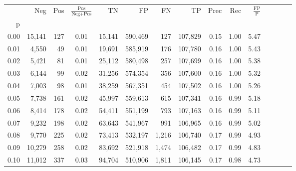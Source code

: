 \begin{tabular}{rrrcrrrrrrrrrrr}
\toprule
{} &     Neg &    Pos & $\frac{\text{Pos}}{\text{Neg}+\text{Pos}}$ &       TN &       FP &       FN &       TP &  Prec &   Rec & $\frac{\text{FP}}{\text{P}}$ \\
p    &         &        &                                            &          &          &          &          &       &       &                              \\
\midrule
0.00 &  15,141 &    127 &                                       0.01 &   15,141 &  590,469 &      127 &  107,829 &  0.15 &  1.00 &                         5.47 \\
0.01 &   4,550 &     49 &                                       0.01 &   19,691 &  585,919 &      176 &  107,780 &  0.16 &  1.00 &                         5.43 \\
0.02 &   5,421 &     81 &                                       0.01 &   25,112 &  580,498 &      257 &  107,699 &  0.16 &  1.00 &                         5.38 \\
0.03 &   6,144 &     99 &                                       0.02 &   31,256 &  574,354 &      356 &  107,600 &  0.16 &  1.00 &                         5.32 \\
0.04 &   7,003 &     98 &                                       0.01 &   38,259 &  567,351 &      454 &  107,502 &  0.16 &  1.00 &                         5.26 \\
0.05 &   7,738 &    161 &                                       0.02 &   45,997 &  559,613 &      615 &  107,341 &  0.16 &  0.99 &                         5.18 \\
0.06 &   8,414 &    178 &                                       0.02 &   54,411 &  551,199 &      793 &  107,163 &  0.16 &  0.99 &                         5.11 \\
0.07 &   9,232 &    198 &                                       0.02 &   63,643 &  541,967 &      991 &  106,965 &  0.16 &  0.99 &                         5.02 \\
0.08 &   9,770 &    225 &                                       0.02 &   73,413 &  532,197 &    1,216 &  106,740 &  0.17 &  0.99 &                         4.93 \\
0.09 &  10,279 &    258 &                                       0.02 &   83,692 &  521,918 &    1,474 &  106,482 &  0.17 &  0.99 &                         4.83 \\
0.10 &  11,012 &    337 &                                       0.03 &   94,704 &  510,906 &    1,811 &  106,145 &  0.17 &  0.98 &                         4.73 \\

\end{tabular}

